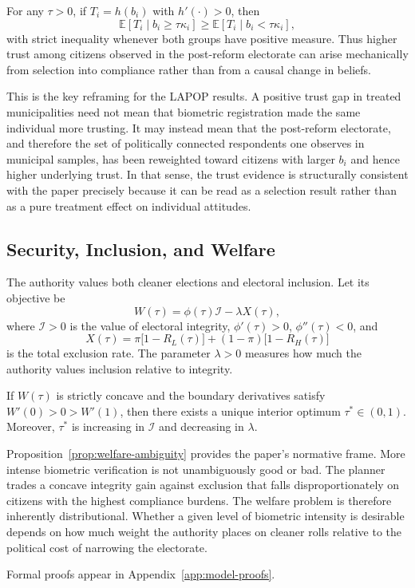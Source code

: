 \begin{proposition}
\label{prop:trust-selection}
For any $\tau>0$, if $T_i=h(b_i)$ with $h'(\cdot)>0$, then
\[
\mathbb{E}[T_i \mid b_i \geq \tau \kappa_i] \geq \mathbb{E}[T_i \mid b_i < \tau \kappa_i],
\]
with strict inequality whenever both groups have positive measure. Thus higher trust among citizens observed in the post-reform electorate can arise mechanically from selection into compliance rather than from a causal change in beliefs.
\end{proposition}

This is the key reframing for the LAPOP results. A positive trust gap in treated municipalities need not mean that biometric registration made the same individual more trusting. It may instead mean that the post-reform electorate, and therefore the set of politically connected respondents one observes in municipal samples, has been reweighted toward citizens with larger $b_i$ and hence higher underlying trust. In that sense, the trust evidence is structurally consistent with the paper precisely because it can be read as a selection result rather than as a pure treatment effect on individual attitudes.

\subsection{Security, Inclusion, and Welfare}

The authority values both cleaner elections and electoral inclusion. Let its objective be
\begin{equation}
\label{eq:model-planner}
W(\tau)=\phi(\tau)\mathcal{I}-\lambda X(\tau),
\end{equation}
where $\mathcal{I}>0$ is the value of electoral integrity, $\phi'(\tau)>0$, $\phi''(\tau)<0$, and
\begin{equation}
\label{eq:model-exclusion}
X(\tau)=\pi\bigl[1-R_L(\tau)\bigr]+(1-\pi)\bigl[1-R_H(\tau)\bigr]
\end{equation}
is the total exclusion rate. The parameter $\lambda>0$ measures how much the authority values inclusion relative to integrity.

\begin{proposition}
\label{prop:welfare-ambiguity}
If $W(\tau)$ is strictly concave and the boundary derivatives satisfy $W'(0)>0>W'(1)$, then there exists a unique interior optimum $\tau^\ast \in (0,1)$. Moreover, $\tau^\ast$ is increasing in $\mathcal{I}$ and decreasing in $\lambda$.
\end{proposition}

Proposition~\ref{prop:welfare-ambiguity} provides the paper's normative frame. More intense biometric verification is not unambiguously good or bad. The planner trades a concave integrity gain against exclusion that falls disproportionately on citizens with the highest compliance burdens. The welfare problem is therefore inherently distributional. Whether a given level of biometric intensity is desirable depends on how much weight the authority places on cleaner rolls relative to the political cost of narrowing the electorate.

Formal proofs appear in Appendix~\ref{app:model-proofs}.
